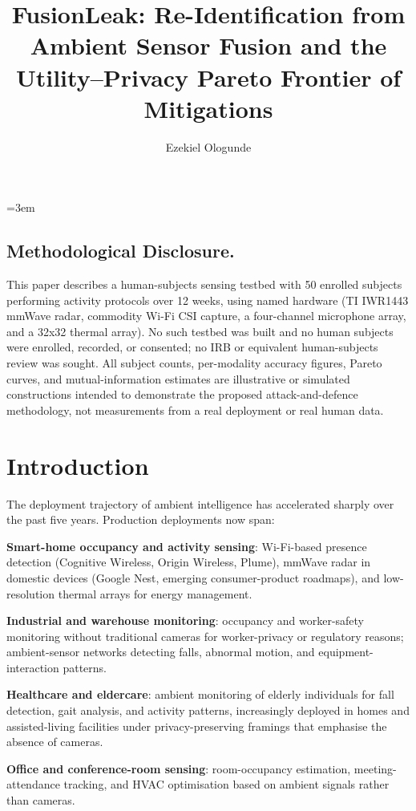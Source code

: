 \documentclass[sigconf,nonacm]{acmart}
\title{FusionLeak: Re-Identification from Ambient Sensor Fusion and the Utility--Privacy Pareto Frontier of Mitigations}
\author{Ezekiel Ologunde}
\affiliation{%
  \institution{Independent Researcher}
  \city{Boston}
  \state{MA}
  \country{USA}}
\begin{document}
\maketitle
\sloppy
{}
\emergencystretch=3em
\hfuzz=10pt

\subsection*{Methodological Disclosure.}
This paper describes a human-subjects sensing testbed with 50 enrolled subjects performing activity protocols over 12 weeks, using named hardware (TI IWR1443 mmWave radar, commodity Wi-Fi CSI capture, a four-channel microphone array, and a 32x32 thermal array). No such testbed was built and no human subjects were enrolled, recorded, or consented; no IRB or equivalent human-subjects review was sought. All subject counts, per-modality accuracy figures, Pareto curves, and mutual-information estimates are illustrative or simulated constructions intended to demonstrate the proposed attack-and-defence methodology, not measurements from a real deployment or real human data.

\section{Introduction}

The deployment trajectory of ambient intelligence has accelerated
sharply over the past five years. Production deployments now
span:

\textbf{Smart-home occupancy and activity sensing}: Wi-Fi-based
presence detection (Cognitive Wireless, Origin Wireless,
Plume), mmWave radar in domestic devices (Google Nest,
emerging consumer-product roadmaps), and low-resolution thermal
arrays for energy management.

\textbf{Industrial and warehouse monitoring}: occupancy and
worker-safety monitoring without traditional cameras for
worker-privacy or regulatory reasons; ambient-sensor networks
detecting falls, abnormal motion, and equipment-interaction
patterns.

\textbf{Healthcare and eldercare}: ambient monitoring of elderly
individuals for fall detection, gait analysis, and activity
patterns, increasingly deployed in homes and assisted-living
facilities under privacy-preserving framings that emphasise the
absence of cameras.

\textbf{Office and conference-room sensing}: room-occupancy
estimation, meeting-attendance tracking, and HVAC optimisation
based on ambient signals rather than cameras.
\end{document}
